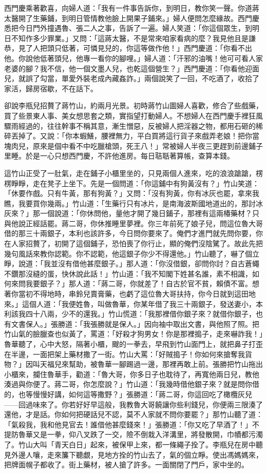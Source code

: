 西門慶乘著歡喜，向婦人道：「我有一件事告訴你，到明日，教你笑一聲。你道蔣太醫開了生藥鋪，到明日管情教他臉上開果子鋪來。」婦人便問怎麼緣故。西門慶悉把今日門外撞遇魯、張二人之事，告訴了一遍。婦人笑道：「你這個眾生，到明日不知作多少罪業。」又問：「這蔣太醫，不是常來咱家看病的麼？我見他且是謙恭，見了人把頭只低著，可憐見兒的，你這等做作他！」西門慶道：「你看不出他。你說他低著頭兒，他專一看你的腳哩。」婦人道：「汗邪的油嘴！他可可看人家老婆的腳？我不信，他一個文墨人兒，也乾這個營生？」西門慶道：「你看他迎面兒，就誤了勾當，單愛外裝老成內藏姦詐。」兩個說笑了一回，不吃酒了，收拾了家活，歸房宿歇，不在話下。

卻說李瓶兒招贅了蔣竹山，約兩月光景。初時蔣竹山圖婦人喜歡，修合了些戲藥，買了些景東人事、美女想思套之類，實指望打動婦人。不想婦人在西門慶手裡狂風驟雨經過的，往往幹事不稱其意，漸生憎惡，反被婦人把淫器之物，都用石砸的稀碎丟掉了。又說：「你本蝦鱔，腰裡無力，平白買將這行貨子來戲弄老娘！把你當塊肉兒，原來是個中看不中吃臘槍頭，死王八！」常被婦人半夜三更趕到前邊鋪子里睡。於是一心只想西門慶，不許他進房。每日聐聒著算帳，查算本錢。

這竹山正受了一肚氣，走在鋪子小櫃里坐的，只見兩個人進來，吃的浪浪蹌蹌，楞楞睜睜，走在凳子上坐下。先是一個問道：「你這鋪中有狗黃沒有？」竹山笑道：「休要作戲。只有牛黃，那有狗黃？」又問：「沒有狗黃，你有冰灰也罷，拿來我瞧，我要買你幾兩。」竹山道：「生藥行只有冰片，是南海波斯國地道出的，那討冰灰來？」那一個說道：「你休問他，量他才開了幾日鋪子，那裡有這兩椿藥材？只與他說正經話罷。蔣二哥，你休推睡里夢裡。你三年前死了娘子兒，問這位魯大哥借的那三十兩銀子，本利也該許多，今日問你要來了。俺們才進門就先問你要，你在人家招贅了，初開了這個鋪子，恐怕喪了你行止，顯的俺們沒陰騭了。故此先把幾句風話來教你認範。你不認範，他這銀子你少不得還他。」竹山聽了，嚇了個立睜，說道：「我並沒有借他甚麼銀子。」那人道：「你沒借銀，卻問你討？自古蒼蠅不鑽那沒縫的蛋，快休說此話！」竹山道：「我不知閣下姓甚名誰，素不相識，如何來問我要銀子？」那人道：「蔣二哥，你就差了！自古於官不貧，賴債不富。想著你當初不得地時，串鈴兒賣膏藥，也虧了這位魯大哥扶持，你今日就到這田地來。」這個人道：「我便姓魯，叫做魯華，你某年借了我三十兩銀子，發送妻小，本利該我四十八兩，少不的還我。」竹山慌道：「我那裡借你銀子來？就借你銀子，也有文書保人。」張勝道：「我張勝就是保人。」因向袖中取出文書，與他照了照。把竹山氣的臉臘查也似黃了，罵道：「好殺才狗男女！你是那裡搗子，走來嚇詐我！」魯華聽了，心中大怒，隔著小櫃，颼的一拳去，早飛到竹山面門上，就把鼻子打歪在半邊，一面把架上藥材撒了一街。竹山大罵：「好賊搗子！你如何來搶奪我貨物？」因叫天福兒來幫助，被魯華一腳踢過一邊，那裡再敢上前。張勝把竹山拖出小櫃來，攔住魯華手，勸道：「魯大哥，你多日子也耽待了，再寬他兩日兒，教他湊過與你便了。蔣二哥，你怎麼說？」竹山道：「我幾時借他銀子來？就是問你借的，也等慢慢好講，如何這等撒野？」張勝道：「蔣二哥，你這回吃了橄欖灰兒——回過味來了。你若好好早這般，我教魯大哥饒讓你些利錢兒，你便兩三限湊了還他，才是話。你如何把硬話兒不認，莫不人家就不問你要罷？」那竹山聽了道：「氣殺我，我和他見官去！誰借他甚麼錢來！」張勝道：「你又吃了早酒了！」不提防魯華又是一拳，仰八叉跌了一交，險不倒栽入洋溝里，將發散開，巾幘都污濁了。竹山大叫「青天白日」起來，被保甲上來，都一條繩子拴了。李瓶兒在房中聽見外邊人嚷，走來簾下聽覷，見地方拴的竹山去了，氣的個立睜。使出馮媽媽來，把牌面幌子都收了。街上藥材，被人搶了許多。一面關閉了門戶，家中坐的。

